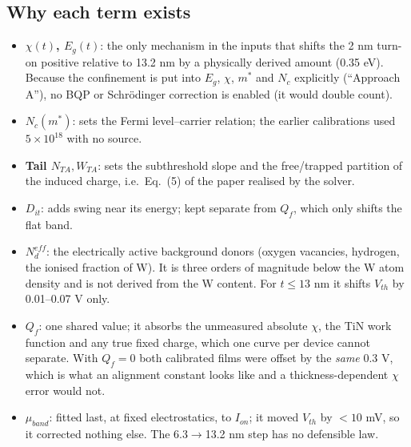 \documentclass[11pt,a4paper]{article}
\begin{document}
\subsection{Why each term exists}
\begin{itemize}[leftmargin=*]
\item \textbf{$\chi(t)$, $E_g(t)$}: the only mechanism in the inputs that shifts the 2 nm turn-on positive relative to 13.2 nm by a physically derived amount (0.35 eV). Because the confinement is put into $E_g$, $\chi$, $m^*$ and $N_c$ explicitly (``Approach A''), no BQP or Schr\"odinger correction is enabled (it would double count).
\item \textbf{$N_c(m^*)$}: sets the Fermi level--carrier relation; the earlier calibrations used $5\times10^{18}$ with no source.
\item \textbf{Tail $N_{TA},W_{TA}$}: sets the subthreshold slope and the free/trapped partition of the induced charge, i.e.\ Eq.~(5) of the paper realised by the solver.
\item \textbf{$D_{it}$}: adds swing near its energy; kept separate from $Q_f$, which only shifts the flat band.
\item \textbf{$N_d^{eff}$}: the electrically active background donors (oxygen vacancies, hydrogen, the ionised fraction of W). It is three orders of magnitude below the W atom density and is not derived from the W content. For $t\le13$ nm it shifts $V_{th}$ by 0.01--0.07 V only.
\item \textbf{$Q_f$}: one shared value; it absorbs the unmeasured absolute $\chi$, the TiN work function and any true fixed charge, which one curve per device cannot separate. With $Q_f=0$ both calibrated films were offset by the \emph{same} 0.3 V, which is what an alignment constant looks like and a thickness-dependent $\chi$ error would not.
\item \textbf{$\mu_{band}$}: fitted last, at fixed electrostatics, to $I_{on}$; it moved $V_{th}$ by $<10$ mV, so it corrected nothing else. The 6.3$\to$13.2 nm step has no defensible law.
\end{itemize}

\end{document}
